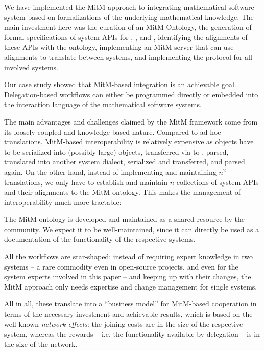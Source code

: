 We have implemented the MitM approach to integrating mathematical software system based on formalizations of the underlying mathematical knowledge.
The main investment here was the curation of an MitM Ontology, the generation of formal specifications of system APIs for \Sage, \GAP, and \Singular, identifying the alignments of these APIs with the ontology, implementing an MitM server that can use alignments to translate between systems, and implementing the \SCSCP protocol for all involved systems. 

Our case study showed that MitM-based integration is an achievable goal.
Delegation-based workflows can either be programmed directly or embedded into the interaction language of the mathematical software systems.

The main advantages and challenges claimed by the MitM framework come from its loosely coupled and knowledge-based nature.
Compared to ad-hoc translations, MitM-based interoperability is relatively expensive as objects have to be serialized into (possibly large) \OMMT objects, transferred via \SCSCP to \MMT, parsed, translated into another system dialect, serialized and transferred, and parsed again.
On the other hand, instead of implementing and maintaining $n^2$ translations, we only have to establish and maintain $n$ collections of system APIs and their alignments to the
MitM ontology.
This makes the management of interoperability much more tractable:
\begin{compactenum}
\item The MitM ontology is developed and maintained as a shared resource by the community.
We expect it to be well-maintained, since it can directly be used as a documentation of the functionality of the respective systems.
\item All the workflows are star-shaped: instead of requiring expert knowledge in two systems -- a rare commodity even in open-source projects, and even for the system experts involved in this paper -- and keeping up with their changes, the MitM approach only needs expertise and change management for single systems.
\end{compactenum}
All in all, these translate into a ``business model'' for MitM-based cooperation in terms of the necessary investment and achievable results, which is based on the well-known \emph{network effects}: the joining costs are in the size of the respective system, whereas the rewards -- i.e. the functionality available by delegation -- is in the size of the network.

